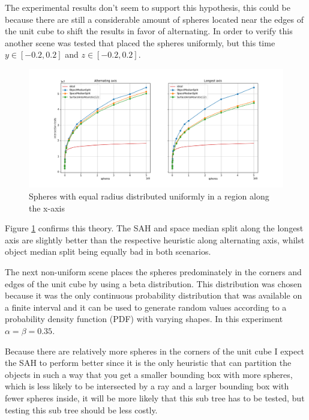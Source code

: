 \documentclass{article}
\begin{document}
The experimental results don't seem to support this hypothesis, this could be because there are still a considerable amount of spheres located near the edges of the unit cube to shift the results in favor of alternating. In order to verify this another scene was tested that placed the spheres uniformly, but this time $y \in [-0.2, 0.2]$ and $z \in [-0.2, 0.2]$.

\begin{figure}[!htb]
    \centering
    \includegraphics[width=12cm]{plots/splitting_heuristics_equal_spheres_uniform_yz.png}
    \caption{Spheres with equal radius distributed uniformly in a region along the x-axis}
    \label{fig:splitting_heuristics_equal_spheres_uniform_yz}
\end{figure}

Figure \ref{fig:splitting_heuristics_equal_spheres_uniform_yz} confirms this theory. The SAH and space median split along the longest axis are slightly better than the respective heuristic along alternating axis, whilst object median split being equally bad in both scenarios.

The next non-uniform scene places the spheres predominately in the corners and edges of the unit cube by using a beta distribution. This distribution was chosen because it was the only continuous probability distribution that was available on a finite interval and it can be used to generate random values according to a probability density function (PDF) with varying shapes. In this experiment $\alpha = \beta = 0.35$.

Because there are relatively more spheres in the corners of the unit cube I expect the SAH to perform better since it is the only heuristic that can partition the objects in such a way that you get a smaller bounding box with more spheres, which is less likely to be intersected by a ray and a larger bounding box with fewer spheres inside, it will be more likely that this sub tree has to be tested, but testing this sub tree should be less costly.
\end{document}
